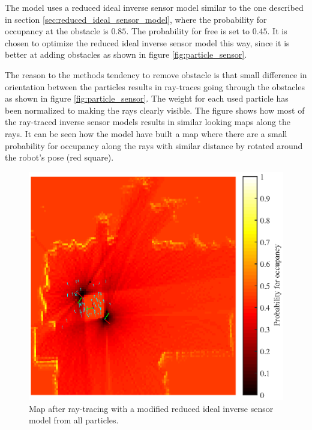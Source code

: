 The model uses a reduced ideal inverse sensor model similar to the one described in section \vref{sec:reduced_ideal_sensor_model}, where the probability for occupancy at the obstacle is $0.85$. The probability for free is set to $0.45$. 
It is chosen to optimize the reduced ideal inverse sensor model this way, since it is better at adding obstacles as shown in figure \vref{fig:particle_sensor}.

The reason to the methods tendency to remove obstacle is that small difference in orientation between the particles results in ray-traces going through the obstacles as shown in figure \vref{fig:particle_sensor}. The weight for each used particle has been normalized to making the rays clearly visible. 
The figure shows how most of the ray-traced inverse sensor models results in similar looking maps along the rays. 
It can be seen how the model have built a map where there are a small probability for occupancy along the rays with similar distance by rotated around the robot's pose (red square). 

\begin{figure}[htbp]
	\centering
	\includegraphics[scale=1.0]{figures/static_mapping/particle_principle}
	\caption{Map after ray-tracing with a modified reduced ideal inverse sensor model from all particles.}
	\label{fig:particle_principle}
\end{figure}

